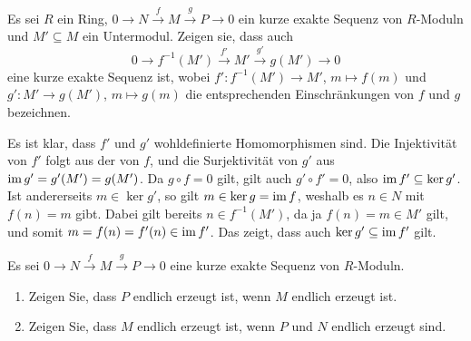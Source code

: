 \begin{question}[subtitle = Einschränkung kurzer exakter Sequenzen]
  \label{question: restriction of a short exact sequence to a submodule of its middle term}
  Es sei $R$ ein Ring, $0 \to N \xrightarrow{f} M \xrightarrow{g} P \to 0$ ein kurze exakte Sequenz von $R$-Moduln und $M' \subseteq M$ ein Untermodul.
  Zeigen sie, dass auch
  \[
    0 \to f^{-1}(M') \xrightarrow{f'} M' \xrightarrow{g'} g(M') \to 0
  \]
  eine kurze exakte Sequenz ist, wobei $f' \colon f^{-1}(M') \to M'$, $m \mapsto f(m)$ und $g' \colon M' \to g(M')$, $m \mapsto g(m)$ die entsprechenden Einschränkungen von $f$ und $g$ bezeichnen.
\end{question}


\begin{solution}
  Es ist klar, dass $f'$ und $g'$ wohldefinierte Homomorphismen sind.
  Die Injektivität von $f'$ folgt aus der von $f$, und die Surjektivität von $g'$ aus $\operatorname{im} g' = g'(M') = g(M')$.
  Da $g \circ f = 0$ gilt, gilt auch $g' \circ f' = 0$, also $\operatorname{im} f' \subseteq \ker g'$.
  Ist andererseits $m \in \ker g'$, so gilt $m \in \ker g = \operatorname{im} f$, weshalb es $n \in N$ mit $f(n) = m$ gibt.
  Dabei gilt bereits $n \in f^{-1}(M')$, da ja $f(n) = m \in M'$ gilt, und somit $m = f(n) = f'(n) \in \operatorname{im} f'$.
  Das zeigt, dass auch $\ker g' \subseteq \operatorname{im} f'$ gilt.
\end{solution}


\begin{question}[subtitle = Endlichkeit in kurzen exakten Sequenzen]
  \label{question: finitely generated in short exact sequences}
  Es sei $0 \to N \xrightarrow{f} M \xrightarrow{g} P \to 0$ eine kurze exakte Sequenz von $R$-Moduln.
  \begin{enumerate}
    \item
      Zeigen Sie, dass $P$ endlich erzeugt ist, wenn $M$ endlich erzeugt ist.
    \item
      Zeigen Sie, dass $M$ endlich erzeugt ist, wenn $P$ und $N$ endlich erzeugt sind.
  \end{enumerate}
\end{question}


